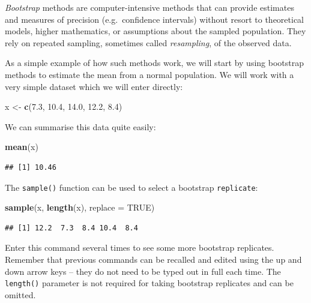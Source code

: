 \documentclass[12pt,a4paper]{book}
\newenvironment{Shaded}{\begin{snugshade}}{\end{snugshade}}
\newcommand{\DataTypeTok}[1]{\textcolor[rgb]{0.13,0.29,0.53}{#1}}
\newcommand{\FloatTok}[1]{\textcolor[rgb]{0.00,0.00,0.81}{#1}}
\newcommand{\KeywordTok}[1]{\textcolor[rgb]{0.13,0.29,0.53}{\textbf{#1}}}
\newcommand{\NormalTok}[1]{#1}
\newcommand{\OtherTok}[1]{\textcolor[rgb]{0.56,0.35,0.01}{#1}}
\newcommand{\StringTok}[1]{\textcolor[rgb]{0.31,0.60,0.02}{#1}}
\theoremstyle{definition}
\theoremstyle{definition}
\theoremstyle{definition}
\theoremstyle{remark}
\begin{document}
\emph{Bootstrap} methods are computer-intensive methods that can provide
estimates and measures of precision (e.g.~confidence intervals) without
resort to theoretical models, higher mathematics, or assumptions about
the sampled population. They rely on repeated sampling, sometimes called
\emph{resampling}, of the observed data.

As a simple example of how such methods work, we will start by using
bootstrap methods to estimate the mean from a normal population. We will
work with a very simple dataset which we will enter directly:

\begin{Shaded}
\begin{Highlighting}[]
\NormalTok{x <-}\StringTok{ }\KeywordTok{c}\NormalTok{(}\FloatTok{7.3}\NormalTok{, }\FloatTok{10.4}\NormalTok{, }\FloatTok{14.0}\NormalTok{, }\FloatTok{12.2}\NormalTok{, }\FloatTok{8.4}\NormalTok{)}
\end{Highlighting}
\end{Shaded}

We can summarise this data quite easily:

\begin{Shaded}
\begin{Highlighting}[]
\KeywordTok{mean}\NormalTok{(x)}
\end{Highlighting}
\end{Shaded}

\begin{verbatim}
## [1] 10.46
\end{verbatim}

The \texttt{sample()} function can be used to select a bootstrap
\texttt{replicate}:

\begin{Shaded}
\begin{Highlighting}[]
\KeywordTok{sample}\NormalTok{(x, }\KeywordTok{length}\NormalTok{(x), }\DataTypeTok{replace =} \OtherTok{TRUE}\NormalTok{)}
\end{Highlighting}
\end{Shaded}

\begin{verbatim}
## [1] 12.2  7.3  8.4 10.4  8.4
\end{verbatim}

Enter this command several times to see some more bootstrap replicates.
Remember that previous commands can be recalled and edited using the up
and down arrow keys -- they do not need to be typed out in full each
time. The \texttt{length()} parameter is not required for taking
bootstrap replicates and can be omitted.
\end{document}

